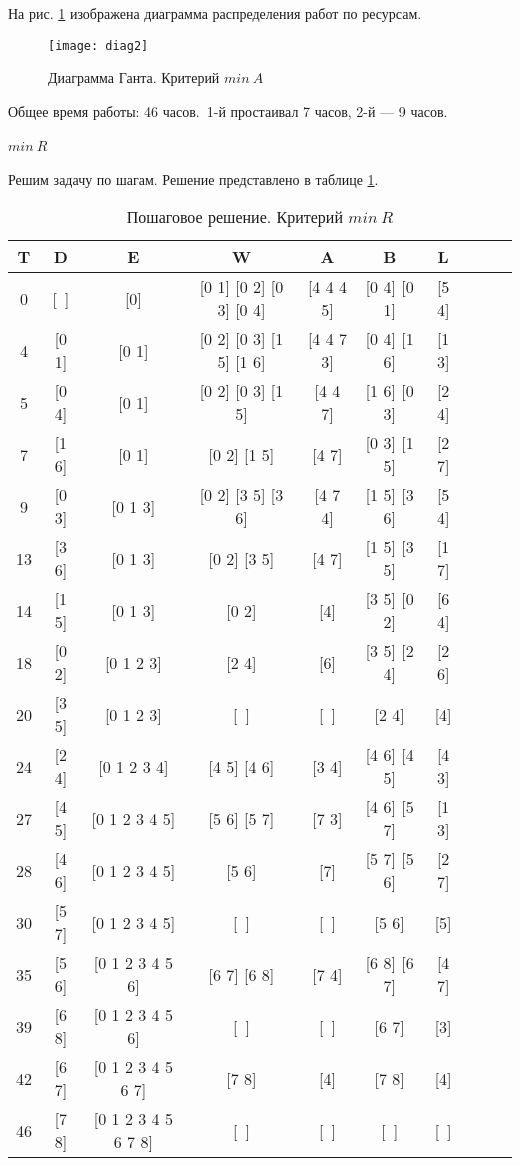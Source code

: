На рис. \ref{pic:diag2} изображена диаграмма распределения работ по ресурсам.

\begin{figure}[H]
\begin{center}
	\texttt{[image: diag2]}
	\caption{Диаграмма Ганта. Критерий $min\ A$}
	\label{pic:diag2}
\end{center}
\end{figure}

Общее время работы: 46 часов.\  1-й простаивал 7 часов, 2-й --- 9 часов.

\paragraph{$min\ R$} Решим задачу по шагам. Решение представлено в таблице \ref{tab:minr}.

\begin{table}[H]
\begin{center}
	\def\tabcolsep{2pt}
	\caption{Пошаговое решение. Критерий $min\ R$}
	\label{tab:minr}
	\begin{tabular}{|c|c|c|c|c|c|c|c|c|c|}
	\hline 
	T & D & E & W & A & B & L\\ \hline
0 & [~] & [0] & [0 1] [0 2] [0 3] [0 4] & [4 4 4 5] & [0 4] [0 1] & [5 4] \\ \hline
4 & [0 1] & [0 1] & [0 2] [0 3] [1 5] [1 6] & [4 4 7 3] & [0 4] [1 6] & [1 3] \\ \hline
5 & [0 4] & [0 1] & [0 2] [0 3] [1 5] & [4 4 7] & [1 6] [0 3] & [2 4] \\ \hline
7 & [1 6] & [0 1] & [0 2] [1 5] & [4 7] & [0 3] [1 5] & [2 7] \\ \hline
9 & [0 3] & [0 1 3] & [0 2] [3 5] [3 6] & [4 7 4] & [1 5] [3 6] & [5 4] \\ \hline
13 & [3 6] & [0 1 3] & [0 2] [3 5] & [4 7] & [1 5] [3 5] & [1 7] \\ \hline
14 & [1 5] & [0 1 3] & [0 2] & [4] & [3 5] [0 2] & [6 4] \\ \hline
18 & [0 2] & [0 1 2 3] & [2 4] & [6] & [3 5] [2 4] & [2 6] \\ \hline
20 & [3 5] & [0 1 2 3] & [~] & [~] & [2 4] & [4] \\ \hline
24 & [2 4] & [0 1 2 3 4] & [4 5] [4 6] & [3 4] & [4 6] [4 5] & [4 3] \\ \hline
27 & [4 5] & [0 1 2 3 4 5] & [5 6] [5 7] & [7 3] & [4 6] [5 7] & [1 3] \\ \hline
28 & [4 6] & [0 1 2 3 4 5] & [5 6] & [7] & [5 7] [5 6] & [2 7] \\ \hline
30 & [5 7] & [0 1 2 3 4 5] & [~] & [~] & [5 6] & [5] \\ \hline
35 & [5 6] & [0 1 2 3 4 5 6] & [6 7] [6 8] & [7 4] & [6 8] [6 7] & [4 7] \\ \hline
39 & [6 8] & [0 1 2 3 4 5 6] & [~] & [~] & [6 7] & [3] \\ \hline
42 & [6 7] & [0 1 2 3 4 5 6 7] & [7 8] & [4] & [7 8] & [4] \\ \hline
46 & [7 8] & [0 1 2 3 4 5 6 7 8] & [~] & [~] & [~] & [~] \\ \hline
	\end{tabular} 
\end{center}
\end{table}

